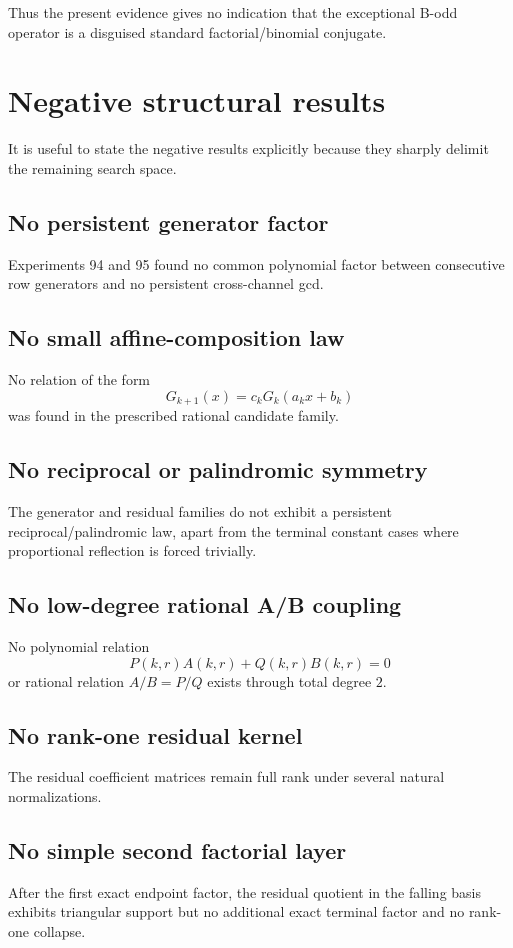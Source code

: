 \documentclass[11pt,a4paper]{article}
\begin{document}
Thus the present evidence gives no indication that the exceptional B-odd operator is a disguised standard factorial/binomial conjugate.

\section{Negative structural results}

It is useful to state the negative results explicitly because they sharply delimit the remaining search space.

\subsection{No persistent generator factor}
Experiments 94 and 95 found no common polynomial factor between consecutive row generators and no persistent cross-channel gcd.

\subsection{No small affine-composition law}
No relation of the form
\[
G_{k+1}(x)=c_kG_k(a_kx+b_k)
\]
was found in the prescribed rational candidate family.

\subsection{No reciprocal or palindromic symmetry}
The generator and residual families do not exhibit a persistent reciprocal/palindromic law, apart from the terminal constant cases where proportional reflection is forced trivially.

\subsection{No low-degree rational A/B coupling}
No polynomial relation
\[
P(k,r)A(k,r)+Q(k,r)B(k,r)=0
\]
or rational relation $A/B=P/Q$ exists through total degree $2$.

\subsection{No rank-one residual kernel}
The residual coefficient matrices remain full rank under several natural normalizations.

\subsection{No simple second factorial layer}
After the first exact endpoint factor, the residual quotient in the falling basis exhibits triangular support but no additional exact terminal factor and no rank-one collapse.
\end{document}
